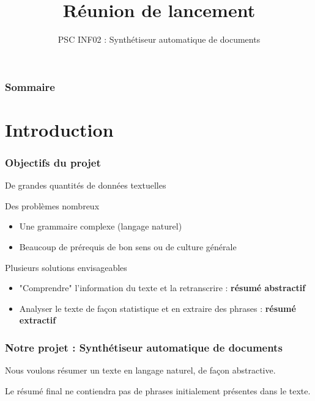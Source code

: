 \documentclass{beamer}
\title{Réunion de lancement}
\subtitle{PSC INF02 : Synthétiseur automatique de documents}
\author{}
\institute{École polytechnique}
\date{}
\begin{document}
\begin{frame}
\titlepage

\end{frame}		
\begin{frame}
\frametitle{Sommaire}
\tableofcontents
\end{frame}



\section{Introduction}

\begin{frame}%
\frametitle{Objectifs du projet}

\begin{block}{De grandes quantités de données textuelles}

\end{block}

\begin{block}{Des problèmes nombreux}
\begin{itemize}
 \item Une grammaire complexe (langage naturel)
 \item Beaucoup de prérequis de bon sens ou de culture générale
\end{itemize}

\end{block}


\begin{block}{Plusieurs solutions envisageables}
\begin{itemize}
\item "Comprendre" l'information du texte et la retranscrire : \textbf{résumé abstractif}
\item Analyser le texte de façon statistique et en extraire des phrases : \textbf{résumé extractif}
\end{itemize}
\end{block}


\end{frame}


\begin{frame}
\frametitle{Notre projet : Synthétiseur automatique de documents}

Nous voulons résumer un texte en langage naturel, de façon abstractive.

Le résumé final ne contiendra pas de phrases initialement présentes dans le texte.

\end{frame}
\end{document}
